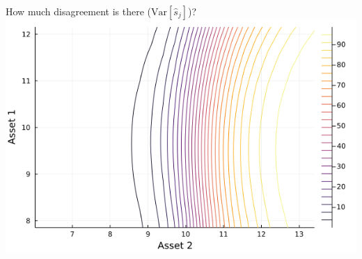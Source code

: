 \documentclass[
  ignorenonframetext,
]{beamer}
\begin{document}
\begin{frame}{How much disagreement is there
(\(\text{Var}[\hat s_j]\))?}
\includegraphics[width=0.4\paperheight]{complexity_files/figure-beamer/unnamed-chunk-17-4}
\end{frame}
\end{document}
